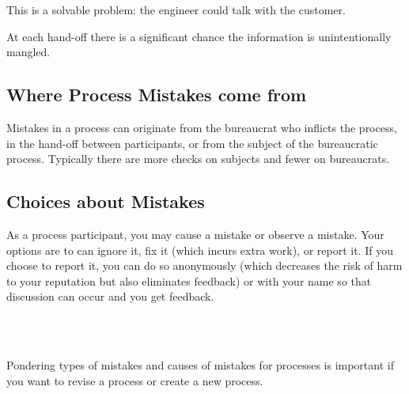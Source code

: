 This is a solvable problem: the engineer could talk with the customer. 

At each hand-off there is a significant chance the information is unintentionally mangled. 

\subsection*{Where Process Mistakes come from}
Mistakes in a process can originate from the bureaucrat who inflicts the process, in the hand-off between participants, or from the \gls{subject} of the bureaucratic process. Typically there are more checks on subjects and fewer on bureaucrats. 

\subsection*{Choices about Mistakes}
As a process participant, you may cause a mistake or observe a mistake. Your options are to can ignore it, fix it (which incurs extra work), or report it. If you choose to report it, you can do so anonymously (which decreases the risk of harm to your reputation but also eliminates feedback) or with your name so that discussion can occur and you get feedback.

\ \\

\noindent\hrulefill

\ \\

Pondering types of mistakes and causes of mistakes for processes is important if you want to revise a process or create a new process.